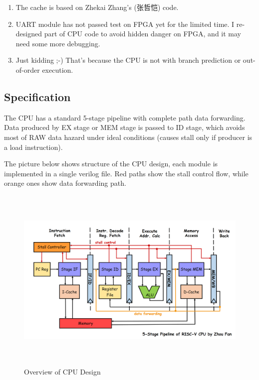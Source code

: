 \documentclass[12pt, a4paper]{article}
\theoremstyle{margin}
\begin{document}
\begin{enumerate}
	\item The cache is based on Zhekai Zhang's (张哲恺) code\cite{zzk}. 
	\item UART module has not passed test on FPGA yet for the limited time. I re-designed part of CPU code to avoid hidden danger on FPGA, and it may need some more debugging.
	\item Just kidding ;-) That's because the CPU is not with branch prediction or out-of-order execution.
\end{enumerate}

\subsection{Specification}

The CPU has a standard 5-stage pipeline with complete path data forwarding. Data produced by EX stage or MEM stage is passed to ID stage, which avoids most of RAW data hazard under ideal conditions (causes stall only if producer is a load instruction).

The picture below shows structure of the CPU design, each module is implemented in a single verilog file. Red paths show the stall control flow, while orange ones show data forwarding path.

\begin{figure}[H]
	\begin{center}
	  \includegraphics[height=9cm]{cpu-pipeline-graph.png}
	\end{center}
	\caption{Overview of CPU Design}
\end{figure}
\end{document}
